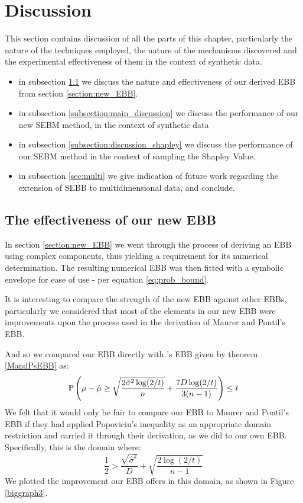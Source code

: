 
\section{Discussion}
\label{sec:discussion}

This section contains discussion of all the parts of this chapter, particularly the nature of the techniques employed, the nature of the mechanisms discovered and the experimental effectiveness of them in the context of synthetic data.
\begin{itemize}
\item	in subsection \ref{subsection:discussion_EBB} we discuss the nature and effectiveness of our derived EBB from section \ref{section:new_EBB}.
\item	in subsection \ref{subsection:main_discussion} we discuss the performance of our new SEBM method, in the context of synthetic data
\item	in subsection \ref{subsection:discussion_shapley} we discuss the performance of our SEBM method in the context of sampling the Shapley Value.
\item	in subsection \ref{sec:multi} we give indication of future work regarding the extension of SEBB to multidimensional data, and conclude.
\end{itemize}



\subsection{The effectiveness of our new EBB}\label{subsection:discussion_EBB}

In section \ref{section:new_EBB} we went through the process of deriving an EBB using complex components, thus yielding a requirement for its numerical determination.
The resulting numerical EBB was then fitted with a symbolic envelope for ease of use - per equation \ref{eq:prob_bound}.

It is interesting to compare the strength of the new EBB against other EBBs, particularly we considered that most of the elements in our new EBB were improvements upon the process used in the derivation of Maurer and Pontil's EBB.

And so we compared our EBB directly with \cite{Maurer50empiricalbernstein}'s EBB given by theorem \ref{MandPsEBB} as:
$$\operatorname{\mathbb{P}}\left(\mu-\hat{\mu}\ge\sqrt{\frac{2\hat{\sigma}^2\log(2/t)}{n}}+\frac{7D\log(2/t)}{3(n-1)}\right)\le t$$
We felt that it would only be fair to compare our EBB to Maurer and Pontil's EBB if they had applied Popoviciu's inequality as an appropriate domain restriction and carried it through their derivation, as we did to our own EBB. 
Specifically, this is the domain where:
\[ \frac{1}{2}>\frac{\sqrt{\hat{\sigma}^2}}{D}+\sqrt{\frac{2\log(2/t)}{n-1}} \]
We plotted the improvement our EBB offers in this domain, as shown in Figure \ref{biggraph3}. 

